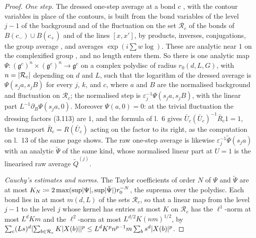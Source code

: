 \documentclass[11pt]{preprint}
\DeclarePairedDelimiter{\abs}{\lvert}{\rvert}
\numberwithin{equation}{section}
\theoremstyle{definition}
\theoremstyle{remark}
\theoremstyle{plain}
\begin{document}
\begin{proof}
\emph{One step.} The dressed one-step average at a bond $c$ \cite[p.~418, l.~6, (3.113)]{BalabanPBG}, with the contour variables \cite[(0.11), p.~253]{BalabanRG1} in place of the contours, is built from the bond variables of the level $j - 1$ of the background and of the fluctuation on the set $\mathcal R_c$ of the bonds of $B(c_-) \cup B(c_+)$ and of the lines $[x, x']$, by products, inverses, conjugations, the group average \cite[(0.10)]{BalabanRG1}, and averages $\exp(i\sum w\log)$. These are analytic near $1$ on the complexified group \cite[p.~252, l.~37; (0.8), p.~253]{BalabanRG1}, and no length enters them. So there is one analytic map $\Psi \colon (\mathfrak g^c)^n \times (\mathfrak g^c)^n \to \mathfrak g^c$ on a complex polydisc of radius $r_0(d, L, G)$, with $n = \abs{\mathcal R_c}$ depending on $d$ and $L$, such that the logarithm of the dressed average is $\Psi(s_ja, s_jB)$ for every $j$, $k$, and $c$, where $a$ and $B$ are the normalised background and fluctuation on $\mathcal R_c$; the normalised step is $\varepsilon_j^{-1}\Psi(s_ja, s_jB)$, with the linear part $L^{-1}\partial_B\Psi(s_ja, 0)$. Moreover $\Psi(a, 0) = 0$: at the trivial fluctuation the dressing factors (3.113) are $1$, and the formula of l.~6 gives $\bar U_c(\bar U_c)^{-1}\bar R_c1 = 1$, the transport $\bar R_c = R(\bar U_c)$ acting on the factor to its right, as the computation on l.~13 of the same page shows. The raw one-step average \cite[(0.4)]{BalabanRG1} is likewise $\varepsilon_j^{-1}\tilde\Psi(s_ja)$ with an analytic $\tilde\Psi$ of the same kind, whose normalised linear part at $U = 1$ is the linearised raw average $\tilde Q^{(j)}$.

\emph{Cauchy's estimates and norms.} The Taylor coefficients of order $N$ of $\Psi$ and $\tilde\Psi$ are at most $K_N \coloneqq 2\max(\sup\abs{\Psi}, \sup\abs{\tilde\Psi})r_0^{-N}$, the suprema over the polydisc. Each bond lies in at most $m(d, L)$ of the sets $\mathcal R_c$, so that a linear map from the level $j - 1$ to the level $j$ whose kernel has entries at most $K$ on $\mathcal R_c$ has the $\ell^1$-norm at most $L^dKm$ and the $\ell^2$-norm at most $L^{d/2}K(nm)^{1/2}$, by $\sum_c(Ls)^d\abs{\sum_{b\in\mathcal R_c}K\abs{X(b)}}^p \leq L^dK^pn^{p-1}m\sum_bs^d\abs{X(b)}^p$.


\end{proof}
\end{document}
